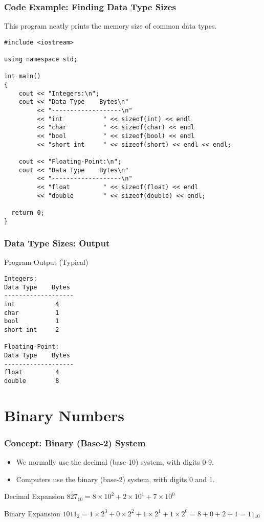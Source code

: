 \documentclass{beamer}
\begin{document}
\begin{frame}[fragile]
\frametitle{Code Example: Finding Data Type Sizes}
This program neatly prints the memory size of common data types.
\begin{verbatim}
#include <iostream>

using namespace std;

int main()
{
    cout << "Integers:\n";
    cout << "Data Type    Bytes\n"
         << "-------------------\n"
         << "int           " << sizeof(int) << endl
         << "char          " << sizeof(char) << endl
         << "bool          " << sizeof(bool) << endl
         << "short int     " << sizeof(short) << endl << endl;

    cout << "Floating-Point:\n";
    cout << "Data Type    Bytes\n"
         << "-------------------\n"
         << "float         " << sizeof(float) << endl
         << "double        " << sizeof(double) << endl;

  return 0;
}
\end{verbatim}
\end{frame}

\begin{frame}[fragile]
\frametitle{Data Type Sizes: Output}
\begin{block}{Program Output (Typical)}
\begin{verbatim}
Integers:
Data Type    Bytes
-------------------
int           4
char          1
bool          1
short int     2

Floating-Point:
Data Type    Bytes
-------------------
float         4
double        8
\end{verbatim}
\end{block}
\end{frame}

\section{Binary Numbers}

\begin{frame}
\frametitle{Concept: Binary (Base-2) System}
\begin{itemize}
    \item We normally use the \alert{decimal (base-10)} system, with digits 0-9.
    \item Computers use the \alert{binary (base-2)} system, with digits 0 and 1.
\end{itemize}
\begin{block}{Decimal Expansion}
$827_{10} = 8 \times 10^2 + 2 \times 10^1 + 7 \times 10^0$
\end{block}
\begin{block}{Binary Expansion}
$1011_2 = 1 \times 2^3 + 0 \times 2^2 + 1 \times 2^1 + 1 \times 2^0 = 8 + 0 + 2 + 1 = 11_{10}$
\end{block}
\end{frame}
\end{document}

